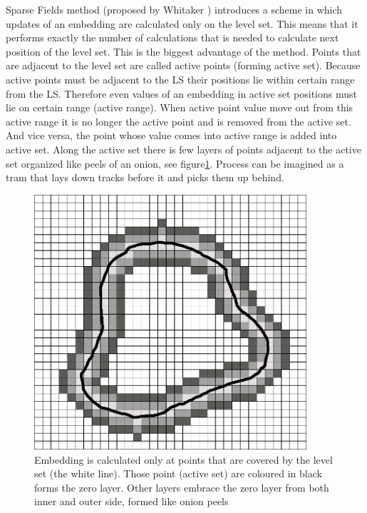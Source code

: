 Sparse Fields method (proposed by Whitaker \cite{sparseFilelds}) introduces a scheme in which updates of an embedding are calculated only on the level set.
This means that it performs exactly the number of calculations that is needed to calculate next position of the level set.
This is the biggest advantage of the method. Points that are adjacent to the level set are called active points (forming active set).
Because active points must be adjacent to the LS their positions lie within certain range from the LS.
Therefore even values of an embedding in active set positions must lie on certain range (active range).
When active point value move out from this active range it is no longer the active point and is removed from the active set.
And vice versa, the point whose value comes into active range is added into active set.
Along the active set there is few layers of points adjacent to the active set organized like peels of an onion, see figure\ref{fg:sparseFilelds}.
Process can be imagined as a tram that lays down tracks before it and picks them up behind.

\begin{figure}
    \centering
    \includegraphics[width=0.9\textwidth]{data/sparsefield}
    \caption[Sparse fields method computation illustration]{Embedding is calculated only at points that are covered by the level set (the white line). Those point (active set) are coloured in black forms the zero layer. Other layers embrace the zero layer from both inner and outer side, formed like onion peels}
    \label{fg:sparseFilelds}
\end{figure}


